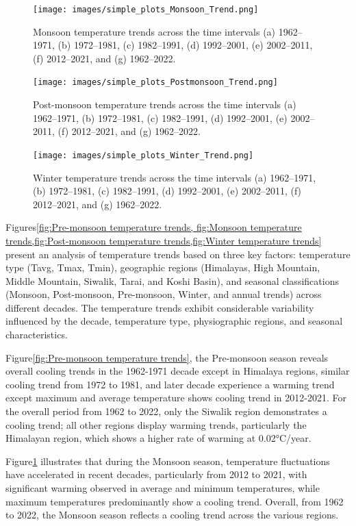 \begin{figure}[H] 
  \centering
  \texttt{[image: images/simple\_plots\_Monsoon\_Trend.png]}  
  \caption{Monsoon temperature trends across the time intervals (a) 1962–1971, (b) 1972–1981, (c) 1982–1991, (d) 1992–2001, (e) 2002–2011, (f) 2012–2021, and (g) 1962–2022.} 
  \label{fig:Monsoon temperature trends}  
\end{figure}

\begin{figure}[H] 
  \centering
  \texttt{[image: images/simple\_plots\_Postmonsoon\_Trend.png]}
  \caption{Post-monsoon temperature trends across the time intervals (a) 1962–1971, (b) 1972–1981, (c) 1982–1991, (d) 1992–2001, (e) 2002–2011, (f) 2012–2021, and (g) 1962–2022.} 
  \label{fig:Post-monsoon temperature trends}  
\end{figure}

\begin{figure}[H] 
  \centering
  \texttt{[image: images/simple\_plots\_Winter\_Trend.png]}  
  \caption{Winter temperature trends across the time intervals (a) 1962–1971, (b) 1972–1981, (c) 1982–1991, (d) 1992–2001, (e) 2002–2011, (f) 2012–2021, and (g) 1962–2022.} 
  \label{fig:Winter temperature trends}  
\end{figure}

Figures\ref{fig:Pre-monsoon temperature trends, fig:Monsoon temperature trends,fig:Post-monsoon temperature trends,fig:Winter temperature trends}  present an analysis of temperature trends based on three key factors: temperature type (Tavg, Tmax, Tmin), geographic regions (Himalayas, High Mountain, Middle Mountain, Siwalik, Tarai, and Koshi Basin), and seasonal classifications (Monsoon, Post-monsoon, Pre-monsoon, Winter, and annual trends) across different decades. The temperature trends exhibit considerable variability influenced by the decade, temperature type, physiographic regions, and seasonal characteristics.


Figure\ref{fig:Pre-monsoon temperature trends}, the Pre-monsoon season reveals overall cooling trends in the 1962-1971 decade except in Himalaya regions, similar cooling trend from 1972 to 1981, and later decade experience a warming trend except maximum and average temperature shows cooling trend in 2012-2021.  For the overall period from 1962 to 2022, only the Siwalik region demonstrates a cooling trend; all other regions display warming trends, particularly the Himalayan region, which shows a higher rate of warming at 0.02°C/year.

Figure\ref{fig:Monsoon temperature trends} illustrates that during the Monsoon season, temperature fluctuations have accelerated in recent decades, particularly from 2012 to 2021, with significant warming observed in average and minimum temperatures, while maximum temperatures predominantly show a cooling trend. Overall, from 1962 to 2022, the Monsoon season reflects a cooling trend across the various regions.

